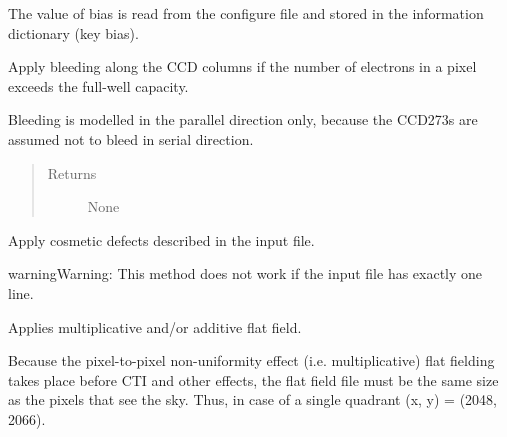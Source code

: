 \documentclass[a4paper,12pt,english]{sphinxmanual}
\begin{document}
\begin{fulllineitems}
\begin{fulllineitems}
The value of bias is read from the configure file and stored
in the information dictionary (key bias).

\end{fulllineitems}


\begin{fulllineitems}
\label{simulator:simulator.simulator.VISsimulator.applyBleeding}
Apply bleeding along the CCD columns if the number of electrons in a pixel exceeds the full-well capacity.

Bleeding is modelled in the parallel direction only, because the CCD273s are assumed not to bleed in
serial direction.
\begin{quote}\begin{description}
\item[{Returns}] \leavevmode
None

\end{description}\end{quote}

\end{fulllineitems}


\begin{fulllineitems}
\label{simulator:simulator.simulator.VISsimulator.applyCosmetics}
Apply cosmetic defects described in the input file.

\begin{notice}{warning}{Warning:}
This method does not work if the input file has exactly one line.
\end{notice}

\end{fulllineitems}


\begin{fulllineitems}
\label{simulator:simulator.simulator.VISsimulator.applyFlatfield}
Applies multiplicative and/or additive flat field.

Because the pixel-to-pixel non-uniformity effect (i.e. multiplicative) flat fielding takes place
before CTI and other effects, the flat field file must be the same size as the pixels that see
the sky. Thus, in case of a single quadrant (x, y) = (2048, 2066).


\end{fulllineitems}
\end{fulllineitems}
\end{document}
